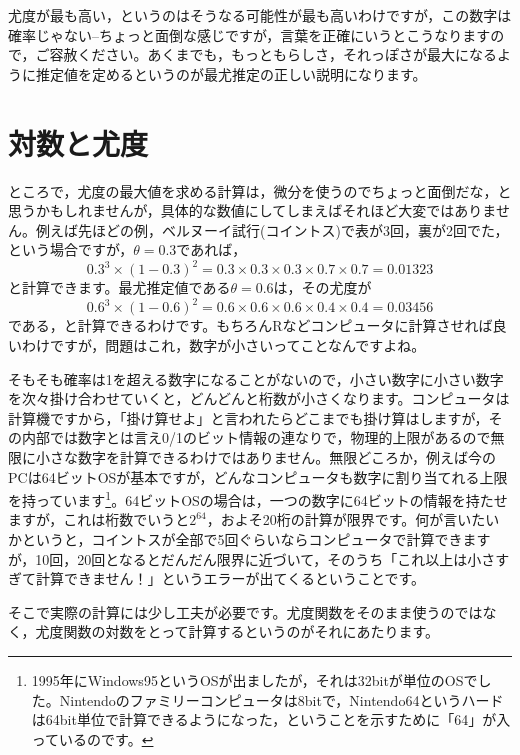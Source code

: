 \documentclass{ltjsarticle}
\begin{document}
尤度が最も高い，というのはそうなる可能性が最も高いわけですが，この数字は確率じゃない--ちょっと面倒な感じですが，言葉を正確にいうとこうなりますので，ご容赦ください。あくまでも，もっともらしさ，それっぽさが最大になるように推定値を定めるというのが最尤推定の正しい説明になります。
\section{対数と尤度}
ところで，尤度の最大値を求める計算は，微分を使うのでちょっと面倒だな，と思うかもしれませんが，具体的な数値にしてしまえばそれほど大変ではありません。例えば先ほどの例，ベルヌーイ試行(コイントス)で表が3回，裏が2回でた，という場合ですが，$\theta=0.3$であれば，
$$ 0.3^3 \times (1-0.3)^2 = 0.3 \times 0.3 \times 0.3 \times 0.7 \times 0.7 = 0.01323$$
と計算できます。最尤推定値である$\theta=0.6$は，その尤度が
$$ 0.6^3 \times (1-0.6)^2 = 0.6 \times 0.6 \times 0.6 \times 0.4 \times 0.4 = 0.03456$$
である，と計算できるわけです。もちろんRなどコンピュータに計算させれば良いわけですが，問題はこれ，数字が小さいってことなんですよね。

そもそも確率は1を超える数字になることがないので，小さい数字に小さい数字を次々掛け合わせていくと，どんどんと桁数が小さくなります。コンピュータは計算機ですから，「掛け算せよ」と言われたらどこまでも掛け算はしますが，その内部では数字とは言え0/1のビット情報の連なりで，物理的上限があるので無限に小さな数字を計算できるわけではありません。無限どころか，例えば今のPCは64ビットOSが基本ですが，どんなコンピュータも数字に割り当てれる上限を持っています\footnote{1995年にWindows95というOSが出ましたが，それは32bitが単位のOSでした。Nintendoのファミリーコンピュータは8bitで，Nintendo64というハードは64bit単位で計算できるようになった，ということを示すために「64」が入っているのです。}。64ビットOSの場合は，一つの数字に64ビットの情報を持たせますが，これは桁数でいうと$2^{64}$，およそ20桁の計算が限界です。何が言いたいかというと，コイントスが全部で5回ぐらいならコンピュータで計算できますが，10回，20回となるとだんだん限界に近づいて，そのうち「これ以上は小さすぎて計算できません！」というエラーが出てくるということです。

そこで実際の計算には少し工夫が必要です。尤度関数をそのまま使うのではなく，尤度関数の対数をとって計算するというのがそれにあたります。
\end{document}
